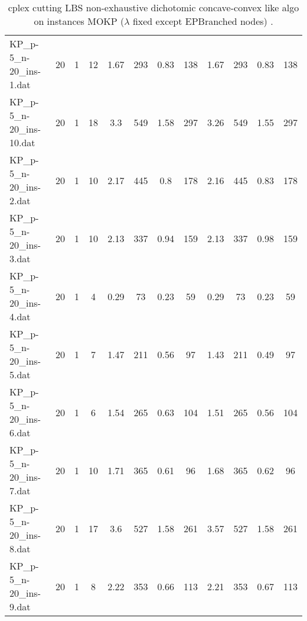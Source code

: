 \begin{sidewaystable}[!ht]
{\begin{tabular}{lccccccccccc}
KP\_p-5\_n-20\_ins-1.dat & 20 & 1 & 12 & 1.67 & 293 &  \textcolor{blue2}{0.83} & 138 & 1.67 & 293 &  \textcolor{blue2}{0.83} & 138 \\
KP\_p-5\_n-20\_ins-10.dat & 20 & 1 & 18 & 3.3 & 549 & 1.58 & 297 & 3.26 & 549 &  \textcolor{blue2}{1.55} & 297 \\
KP\_p-5\_n-20\_ins-2.dat & 20 & 1 & 10 & 2.17 & 445 &  \textcolor{blue2}{0.8} & 178 & 2.16 & 445 & 0.83 & 178 \\
KP\_p-5\_n-20\_ins-3.dat & 20 & 1 & 10 & 2.13 & 337 &  \textcolor{blue2}{0.94} & 159 & 2.13 & 337 & 0.98 & 159 \\
KP\_p-5\_n-20\_ins-4.dat & 20 & 1 & 4 & 0.29 & 73 &  \textcolor{blue2}{0.23} & 59 & 0.29 & 73 &  \textcolor{blue2}{0.23} & 59 \\
KP\_p-5\_n-20\_ins-5.dat & 20 & 1 & 7 & 1.47 & 211 & 0.56 & 97 & 1.43 & 211 &  \textcolor{blue2}{0.49} & 97 \\
KP\_p-5\_n-20\_ins-6.dat & 20 & 1 & 6 & 1.54 & 265 & 0.63 & 104 & 1.51 & 265 &  \textcolor{blue2}{0.56} & 104 \\
KP\_p-5\_n-20\_ins-7.dat & 20 & 1 & 10 & 1.71 & 365 &  \textcolor{blue2}{0.61} & 96 & 1.68 & 365 & 0.62 & 96 \\
KP\_p-5\_n-20\_ins-8.dat & 20 & 1 & 17 & 3.6 & 527 & 1.58 & 261 & 3.57 & 527 & 1.58 & 261 \\
KP\_p-5\_n-20\_ins-9.dat & 20 & 1 & 8 & 2.22 & 353 &  \textcolor{blue2}{0.66} & 113 & 2.21 & 353 & 0.67 & 113 \\
\bottomrule
\end{tabular}
}%
\caption{cplex cutting LBS non-exhaustive dichotomic concave-convex like algo on instances MOKP ($\lambda$ fixed except EPBranched nodes) .}
\end{sidewaystable}
